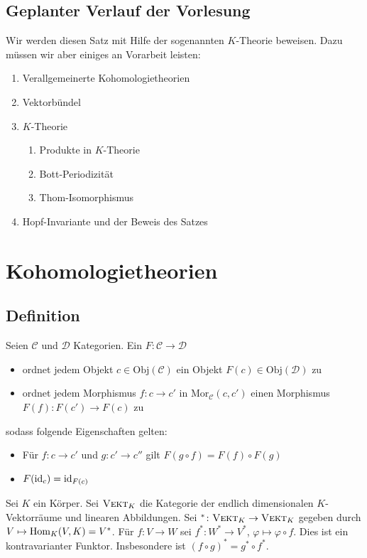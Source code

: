 \subsection{Geplanter Verlauf der Vorlesung} %
\label{sub:inhalt}
Wir werden diesen Satz mit Hilfe der sogenannten $K$-Theorie beweisen. Dazu müssen wir aber einiges an Vorarbeit leisten:
\begin{enumerate}[1.]
	\item Verallgemeinerte Kohomologietheorien
	\item Vektorbündel
	\item $K$-Theorie
	\begin{enumerate}[label*=\arabic*.]
		\item Produkte in $K$-Theorie
		\item Bott-Periodizität
		\item Thom-Isomorphismus
	\end{enumerate}
	\item Hopf-Invariante und der Beweis des Satzes
\end{enumerate}
\newpage

\section{Kohomologietheorien} %
\label{sec:1}

\subsection[Definition: Kontravarianter Funktor]{Definition} %
\label{sub:11}
Seien $\mathcal{C}$ und $\mathcal{D}$ Kategorien. Ein  $F \colon \mathcal{C} \to \mathcal{D}$ 
\begin{itemize}
	\item ordnet jedem Objekt $c \in \mathrm{Obj}(\mathcal{C})$ ein Objekt $F(c) \in \mathrm{Obj}(\mathcal{D})$ zu
	\item ordnet jedem Morphismus $f \colon c \to c'$ in $\mathrm{Mor}_{\mathcal{C}}(c,c')$ einen Morphismus $F(f) \colon F(c') \to F(c)$ zu 
\end{itemize}
sodass folgende Eigenschaften gelten:
\begin{itemize}
	\item Für $f \colon c \to c'$ und $g \colon c' \to c''$ gilt $F(g \circ f) = F(f) \circ F(g)$
	\item $F(\operatorname{id}_c) = \operatorname{id}_{F(c)}$
\end{itemize}
Sei $K$ ein Körper. Sei $\textsc{Vekt}_K$ die Kategorie der endlich dimensionalen $K$-Vektorräume und linearen Abbildungen. Sei 
${ }^* \colon \textsc{Vekt}_K \to \textsc{Vekt}_K$ gegeben durch $V \mapsto \operatorname{Hom}_K(V,K)=V^*$. Für $f \colon V \to W$ sei $f^* \colon W^* \to V^*$, 
$\varphi \mapsto \varphi \circ f$. Dies ist ein kontravarianter Funktor. Insbesondere ist $(f \circ g)^* = g^* \circ f^*$.

